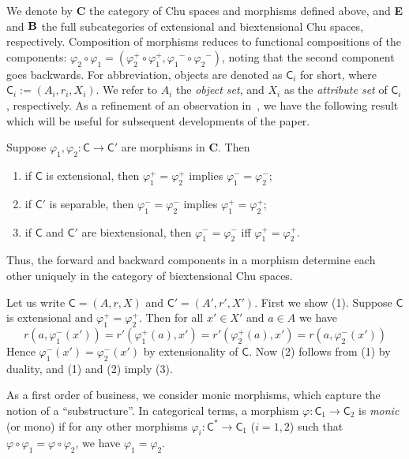 \documentclass{LMCS}
\let\pf\proof
\let\epf\endproof
\begin{document}
We denote by {\bf C}  the category of Chu spaces and morphisms defined above, and {\bf E} and
${\bf B}$ the full subcategories of extensional and biextensional  Chu spaces, respectively.
Composition of morphisms reduces to functional compositions of the components:
$\varphi_2\circ \varphi_1 = (\varphi^+_2\circ \varphi^+_1, {\varphi_1}^{-} \circ  {\varphi_2}^{-} )$,
noting that the second component goes backwards.
For abbreviation, objects are denoted as $\mathsf{C}_i$ for short, where $\mathsf{C}_i := (A_i, r_i, X_i)$.
We refer to $A_i$ the {\em object set}, and $X_i$ as the {\em attribute set} of $\mathsf{C}_i$, respectively.
As a refinement of an observation in~\cite{lamarche}, we have the following
result which will be useful for subsequent developments of the paper.

\begin{prop}\label{lamarche}
Suppose $\varphi_1, \varphi_2: \mathsf{C}\to  \mathsf{C}'$ are morphisms in {\bf C}.
Then
\begin{enumerate}[\em(1)]
\item if   $\mathsf{C}$ is extensional, then $\varphi_1^{+} = \varphi_2^{+} $ implies $\varphi_1^{-} = \varphi_2^{-}$;
\item if   $\mathsf{C}'$  is separable, then $\varphi_1^{-} = \varphi_2^{-} $ implies $\varphi_1^{+} = \varphi_2^{+}$;
\item if   $\mathsf{C}$ and $\mathsf{C}'$ are biextensional, then $\varphi_1^{-} = \varphi_2^{-} $ iff $\varphi_1^{+} = \varphi_2^{+}$.
\end{enumerate}
\end{prop}

Thus,  the forward and backward components in a morphism determine each other
uniquely in the category of biextensional Chu spaces.

\pf
Let us write $\mathsf{C}=(A, r, X)$ and $\mathsf{C}'=(A', r', X')$.  First
we show (1). Suppose $\mathsf{C}$ is extensional and $ \varphi_1^{+} =
\varphi_2^{+}$. Then for all $x' \in X'$ and $a \in A$ we have
$$
   r(a, \varphi_1^{-} (x'))= r'(\varphi_1^{+}(a), x') = r'(\varphi_2^{+}(a),x') = r(a,\varphi_2^{-} (x'))
$$
Hence $\varphi_1^{-} (x') = \varphi_2^{-} (x')$ by extensionality of
$\mathsf{C}$. Now (2) follows from (1) by duality, and (1) and (2) imply
(3).  \epf

As a first order of business, we consider monic morphisms,
which capture the notion of a ``substructure''.
In categorical terms, a morphism $\varphi: \mathsf{C}_1\to \mathsf{C}_2$ is {\em monic} (or mono)
if for any other morphisms $\varphi_i : \mathsf{C}^* \to  \mathsf{C}_1$ ($i=1,2$) such that
$\varphi \circ \varphi_1 = \varphi \circ \varphi_2$, we have
$\varphi_1= \varphi_2$.
\end{document}
